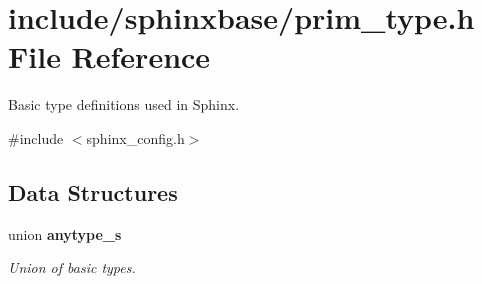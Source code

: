 \section{include/sphinxbase/prim\+\_\+type.h File Reference}
\label{prim__type_8h}


Basic type definitions used in Sphinx.  


{\ttfamily \#include $<$sphinx\+\_\+config.\+h$>$}\newline
\subsection*{Data Structures}
\begin{DoxyCompactItemize}
\item 
union \textbf{ anytype\+\_\+s}
\begin{DoxyCompactList}\small\item\em Union of basic types. \end{DoxyCompactList}\end{DoxyCompactItemize}
